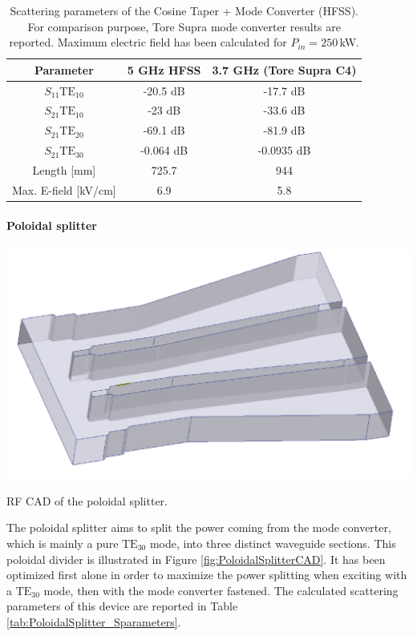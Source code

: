\begin{table}[h]
	\begin{centering}
		\begin{tabular}{|c|c|c|}
			\hline 
			Parameter & \multicolumn{1}{c|}{5 GHz HFSS } & 3.7 GHz (Tore Supra C4) \tabularnewline
			\hline 
			\hline 
			$S_{11}$$\mbox{TE}_{10}$  & -20.5 dB  & -17.7 dB\tabularnewline
			\hline 
			$S_{21}$$\mbox{TE}_{10}$ & -23 dB  & -33.6 dB\tabularnewline
			\hline 
			$S_{21}$$\mbox{TE}_{20}$ & -69.1 dB  & -81.9 dB\tabularnewline
			\hline 
			$S_{21}$$\mbox{TE}_{30}$ & -0.064 dB  & -0.0935 dB\tabularnewline
			\hline 
			Length {[}mm{]} & \multicolumn{1}{c|}{725.7} & 944\tabularnewline
			\hline 
			Max. E-field {[}kV/cm{]} & \multicolumn{1}{c|}{6.9 } & 5.8\tabularnewline
			\hline 
		\end{tabular}
		\par\end{centering}
	
	\caption{Scattering parameters of the Cosine Taper + Mode Converter (HFSS). For comparison purpose, Tore Supra mode converter results are reported. Maximum electric field has been calculated for $P_{in}=250$\,kW.\label{tab:S-ParametersALL}}
\end{table}


\paragraph{Poloidal splitter}
\begin{marginfigure}
	\includegraphics[width=1.0\textwidth]{figures/chap3/ITER_modeconverter/HFSS_PoloidalJunction}
	\caption{RF CAD of the poloidal splitter.}
	\label{fig:PoloidalSplitterCAD}
\end{marginfigure}
The poloidal splitter aims to split the power coming from the mode converter, which is mainly a pure $\mbox{TE}_{30}$ mode, into three distinct waveguide sections. This poloidal divider is illustrated in Figure \ref{fig:PoloidalSplitterCAD}. It has been optimized first alone in order to maximize the power splitting when exciting with a $\mbox{TE}_{30}$ mode, then with the mode converter fastened. The calculated scattering parameters of this device are reported in Table \ref{tab:PoloidalSplitter_Sparameters}.

